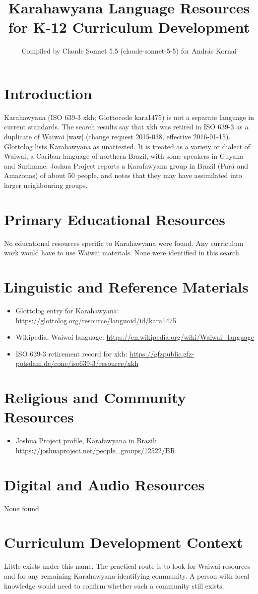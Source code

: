 \documentclass[12pt]{article}
\title{Karahawyana Language Resources for K-12 Curriculum Development}
\author{Compiled by Claude Sonnet 5.5 (claude-sonnet-5-5) for Andr\'as Kornai}
\date{}
\begin{document}
\maketitle

\section{Introduction}
Karahawyana (ISO 639-3 xkh; Glottocode kara1475) is not a separate language in current standards. The search results say that xkh was retired in ISO 639-3 as a duplicate of Waiwai [waw] (change request 2015-038, effective 2016-01-15). Glottolog lists Karahawyana as unattested. It is treated as a variety or dialect of Waiwai, a Cariban language of northern Brazil, with some speakers in Guyana and Suriname. Joshua Project reports a Karafawyana group in Brazil (Par\'a and Amazonas) of about 50 people, and notes that they may have assimilated into larger neighbouring groups.

\section{Primary Educational Resources}
No educational resources specific to Karahawyana were found. Any curriculum work would have to use Waiwai materials. None were identified in this search.

\section{Linguistic and Reference Materials}
\begin{itemize}
\item Glottolog entry for Karahawyana: \url{https://glottolog.org/resource/languoid/id/kara1475}
\item Wikipedia, Waiwai language: \url{https://en.wikipedia.org/wiki/Waiwai_language}
\item ISO 639-3 retirement record for xkh: \url{https://gfzpublic.gfz-potsdam.de/cone/iso639-3/resource/xkh}
\end{itemize}

\section{Religious and Community Resources}
\begin{itemize}
\item Joshua Project profile, Karafawyana in Brazil: \url{https://joshuaproject.net/people_groups/12522/BR}
\end{itemize}

\section{Digital and Audio Resources}
None found.

\section{Curriculum Development Context}
Little exists under this name. The practical route is to look for Waiwai resources and for any remaining Karahawyana-identifying community. A person with local knowledge would need to confirm whether such a community still exists.
\end{document}
